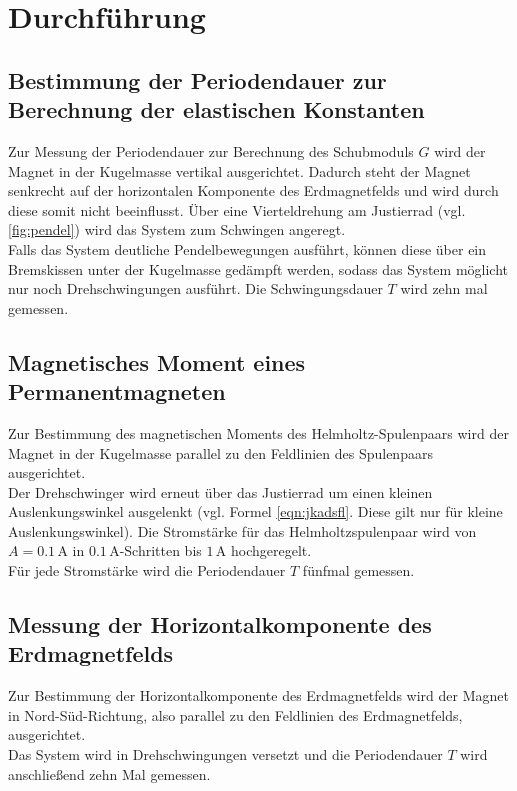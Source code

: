 
\section{Durchführung}
\label{sec:Durchführung}
\subsection{Bestimmung der Periodendauer zur Berechnung der elastischen Konstanten}
Zur Messung der Periodendauer zur Berechnung des Schubmoduls $G$ wird der Magnet in der Kugelmasse vertikal ausgerichtet. Dadurch steht der Magnet senkrecht auf der horizontalen Komponente des Erdmagnetfelds und wird durch diese somit nicht beeinflusst.
Über eine Vierteldrehung am Justierrad (vgl. \ref{fig:pendel}) wird das System zum Schwingen angeregt.\\
Falls das System deutliche Pendelbewegungen ausführt, können diese über ein Bremskissen unter der Kugelmasse gedämpft werden, sodass das System möglicht nur noch Drehschwingungen ausführt.
Die Schwingungsdauer $T$ wird zehn mal gemessen.
\subsection{Magnetisches Moment eines Permanentmagneten}
Zur Bestimmung des magnetischen Moments des Helmholtz-Spulenpaars wird der Magnet in der Kugelmasse parallel zu den Feldlinien des Spulenpaars ausgerichtet.\\
Der Drehschwinger wird erneut über das Justierrad um einen kleinen Auslenkungswinkel ausgelenkt (vgl. Formel \eqref{eqn:jkadsfl}. Diese gilt nur für kleine Auslenkungswinkel).
Die Stromstärke für das Helmholtzspulenpaar wird von $A=0.1\,\si{\ampere}$ in $0.1\,\si{\ampere}$-Schritten bis $1\,\si{\ampere}$ hochgeregelt. \\
Für jede Stromstärke wird die Periodendauer $T$ fünfmal gemessen.
\subsection{Messung der Horizontalkomponente des Erdmagnetfelds}
Zur Bestimmung der Horizontalkomponente des Erdmagnetfelds wird der Magnet in Nord-Süd-Richtung, also parallel zu den Feldlinien des Erdmagnetfelds, ausgerichtet.\\
Das System wird in Drehschwingungen versetzt und die Periodendauer $T$ wird anschließend zehn Mal gemessen.
